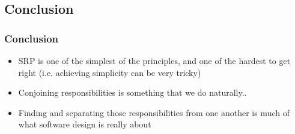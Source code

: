 \documentclass{beamer}
\begin{document}
\subsection{Conclusion}
\begin{frame}
  \frametitle{Conclusion}
  \begin{itemize}
	\item<+-> SRP is one of the simplest of the principles, and one of the hardest to get right (i.e. achieving simplicity can be very tricky)
	\item<+-> Conjoining responsibilities is something that we do naturally..
	\item<+-> Finding and separating those responsibilities from one another is much of what software design is really about
   \end{itemize}
\end{frame}
\end{document}

